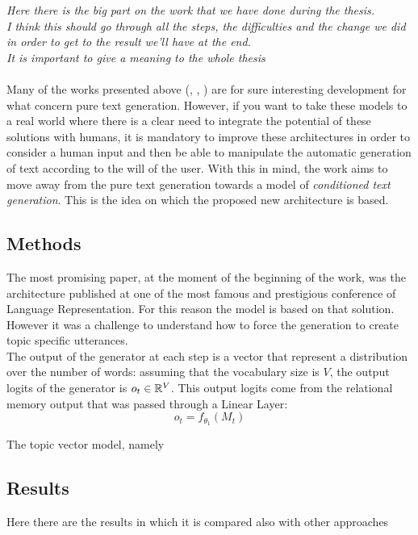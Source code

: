\textit{Here there is the big part on the work that we have done during the thesis. \\
I think this should go through all the steps, the difficulties and the change we did in order to get to the result we'll have at the end. \\
It is important to give a meaning to the whole thesis
\\ \\}
Many of the works presented above (, , ) are for sure interesting development for what concern pure text generation. However, if you want to take these models to a real world where there is a clear need to integrate the potential of these solutions with humans, it is mandatory to improve these architectures in order to consider a human input and then be able to manipulate the automatic generation of text according to the will of the user. With this in mind, the work aims to move away from the pure text generation towards a model of \textit{conditioned text generation}. This is the idea on which the proposed new architecture is based.

\subsection{Methods}
The most promising paper, at the moment of the beginning of the work, was the  architecture published at one of the most famous and prestigious conference of Language Representation. For this reason the model is based on that solution. However it was a challenge to understand how to force the generation to create topic specific utterances. \\
The output of the generator at each step is a vector that represent a distribution over the number of words: assuming that the vocabulary size is $V$, the output logits of the generator is $o_{t} \in \mathbb{R} ^{V}$. This output logits come from the relational memory output that was passed through a Linear Layer:
\begin{equation}
o_{t} = f_{\theta_{1}}(M_{t})
\end{equation}


The topic vector model, namely 

\subsection{Results}
Here there are the results in which it is compared also with other approaches